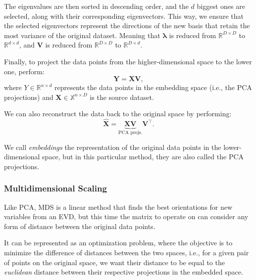             The eigenvalues are then sorted in descending order, and the $d$ biggest ones are selected, along with their corresponding eigenvectors. This way, we ensure that the selected eigenvectors represent the directions of the new basis that retain the most variance of the original dataset. Meaning that $\boldsymbol{\lambda}$ is reduced from $\mathbb{R}^{D\times D}$ to $\mathbb{R}^{d\times d}$, and $\boldsymbol{V}$ is reduced from $\mathbb{R}^{D\times D}$ to $\mathbb{R}^{D\times d}$.

            Finally, to project the data points from the higher-dimensional space to the lower one, perform:
            \begin{equation}
                \boldsymbol{Y} = \boldsymbol{XV},
                \label{reduction mapping}
            \end{equation}
            where $Y\in\mathbb{R}^{n\times d}$ represents the data points in the embedding space (i.e., the PCA projections) and $\boldsymbol{X}\in\mathbb{X}^{n\times D}$ is the source dataset.
            
            We can also reconstruct the data back to the original space by performing:
            \begin{equation}
                \boldsymbol{\hat{X}} = \underbrace{\boldsymbol{XV}}_{\text{PCA projs.}}\boldsymbol{V}^\top.
            \end{equation}
            
            We call \textit{embeddings} the representation of the original data points in the lower-dimensional space, but in this particular method, they are also called the PCA projections.

        \subsubsection{Multidimensional Scaling}
            Like \ac{PCA}, \ac{MDS} \cite{mds, mds-nonmetric} is a linear method that finds the best orientations for new variables from an \ac{EVD}, but this time the matrix to operate on can consider any form of distance between the original data points.
            
            It can be represented as an optimization problem, where the objective is to minimize the difference of distances between the two spaces, i.e., for a given pair of points on the original space, we want their distance to be equal to the \textit{euclidean} distance between their respective projections in the embedded space.

